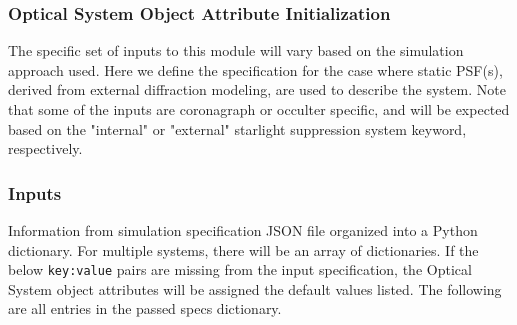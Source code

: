 \documentclass[cleanfoot]{asme2ej}
\begin{document}
\label{sec:opticalsystem}
\subsubsection{Optical System Object Attribute Initialization} 

The specific set of inputs to this module will vary based on the simulation approach used.  Here we define the specification for the case where static PSF(s), derived from external diffraction modeling, are used to describe the system.  Note that some of the inputs are coronagraph or occulter specific, and will be expected based on the "internal" or "external" starlight suppression system keyword, respectively.


\subsubsection*{Inputs}
Information from simulation specification JSON file organized into a Python dictionary.  For multiple systems, there will be an array of dictionaries. If the below \verb+key:value+ pairs are missing from the input specification, the Optical System object attributes will be assigned the default values listed. The following are all entries in the passed specs dictionary.
\end{document}
